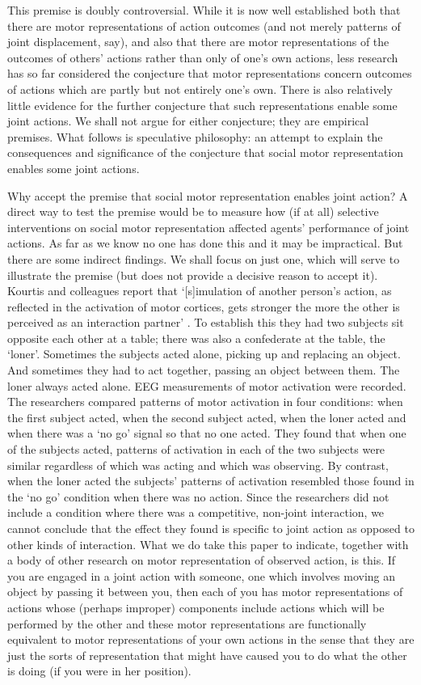 \documentclass[12pt,\papersize]{extarticle}
\begin{document}
This premise is doubly controversial.
While it is now well established both that there are motor representations of action outcomes (and not merely patterns of joint displacement, say), and also that there are motor representations of the outcomes of others' actions rather than only of one's own actions,
less research has so far considered the conjecture that motor representations concern outcomes of actions which are partly but not entirely one's own.
There is also relatively little evidence for the further conjecture that such representations enable some joint actions.
We shall not argue for either conjecture; they are empirical premises.  
What follows is speculative philosophy: an attempt to explain the consequences and significance of the conjecture that social motor representation enables some joint actions.

Why accept the premise that social motor representation enables joint action?
A direct way to test the premise would be to 
measure how (if at all) selective interventions on social motor representation affected agents’ performance of joint actions.
As far as we know no one has done this and it may be impractical.
But there are some indirect findings.
We shall focus on just one, which will serve to illustrate the premise (but does not provide a decisive reason to accept it).
Kourtis and colleagues report that `[s]imulation of another person’s action, as reflected in the activation of motor cortices, gets stronger the more the other is perceived as an interaction partner’  \citep[p.\ 4]{kourtis:2010_favoritism}.
To establish this they had two subjects sit opposite each other at a table; there was also a confederate at the table, the `loner'.  
Sometimes the subjects acted alone, picking up and replacing an object.  And sometimes they had to act together, passing an object between them.  
The loner always acted alone.
EEG measurements of motor activation were recorded.
The researchers compared patterns of motor activation in four conditions: when the first subject acted, when the second subject acted, when the loner acted and when there was a `no go' signal so that no one acted.
They found that when one of the subjects acted, patterns of activation in each of the two subjects were similar regardless of which was acting and which was observing.
By contrast, when the loner acted the subjects' patterns of activation resembled those found in the `no go' condition when there was no action.
Since the researchers did not include a condition where there was a competitive, non-joint interaction, we cannot conclude that the effect they found is specific to joint action as opposed to other kinds of interaction.
What we do take this paper to indicate, 
together with a body of other research on motor representation of observed action,
is this.
If you are engaged in a joint action with someone, one which involves moving an object by passing it between you, then each of you has motor representations of actions whose (perhaps improper) components include actions which will be performed by the other  and these motor representations are functionally equivalent to motor representations of your own actions in the sense that they are just the sorts of representation that might have caused you to do what the other is doing (if you were in her position).
\end{document}
